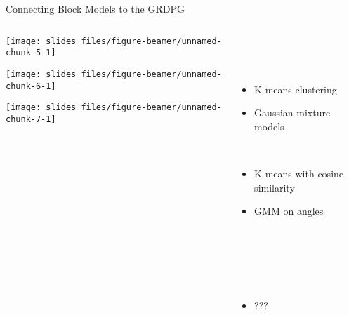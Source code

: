 \documentclass[
  ignorenonframetext,
]{beamer}
\providecommand{\tightlist}{%
  \setlength{\itemsep}{0pt}\setlength{\parskip}{0pt}}
\begin{document}
\begin{frame}{Connecting Block Models to the GRDPG}
\protect\hypertarget{connecting-block-models-to-the-grdpg}{}
\begin{columns}[T]
\begin{column}{0.67\textwidth}
\begin{center}\texttt{[image: slides\_files/figure-beamer/unnamed-chunk-5-1]} \end{center}

\begin{center}\texttt{[image: slides\_files/figure-beamer/unnamed-chunk-6-1]} \end{center}

\begin{center}\texttt{[image: slides\_files/figure-beamer/unnamed-chunk-7-1]} \end{center}
\end{column}

\begin{column}{0.33\textwidth}
~

~

\begin{itemize}
\tightlist
\item
  K-means clustering
\item
  Gaussian mixture models
\end{itemize}

~

\begin{itemize}
\tightlist
\item
  K-means with cosine similarity
\item
  GMM on angles
\end{itemize}

~

~

~

\begin{itemize}
\tightlist
\item
  ???
\end{itemize}
\end{column}
\end{columns}
\end{frame}
\end{document}
